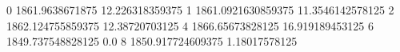0 1861.9638671875 12.226318359375
1 1861.0921630859375 11.3546142578125
2 1862.124755859375 12.38720703125
4 1866.65673828125 16.919189453125
6 1849.737548828125 0.0
8 1850.917724609375 1.18017578125
